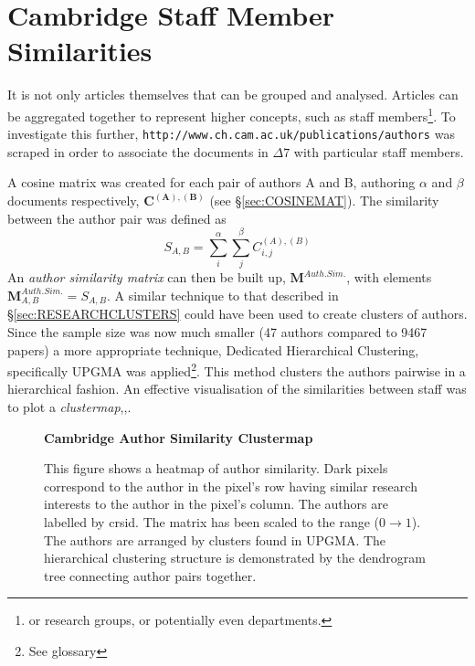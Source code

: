 \section{Cambridge Staff Member Similarities}
\label{sec:AUTHORCLUSTERS}

It is not only articles themselves that can be grouped and analysed. Articles can be aggregated together to represent higher concepts, such as staff members\footnote{or research groups, or potentially even departments. }. To investigate this further, \texttt{http://www.ch.cam.ac.uk/publications/authors} was scraped in order to associate the documents in $\Delta7$ with particular staff members.

A cosine matrix was created for each pair of authors A and B, authoring $\alpha$ and $\beta$ documents respectively, $\mathbf{C^{\left( A \right ) , \left( B \right)}}$ (see \S\ref{sec:COSINEMAT}). The similarity between the author pair was defined as 
$$S_{A , B} = \sum_{i}^{\alpha} \sum_{j}^{\beta} C^{\left( A \right) , \left( B \right) }_{ i , j }$$
An \emph{author similarity matrix} can then be built up, $\mathbf{M}^{Auth. Sim.}$, with elements $\mathbf{M}^{Auth. Sim.}_{ A , B }=S_{ A , B }$.
A similar technique to that described in  \S\ref{sec:RESEARCHCLUSTERS} could have been used to create clusters of authors. Since the sample size was now much smaller (47 authors compared to 9467 papers) a more appropriate technique, Dedicated Hierarchical Clustering, specifically UPGMA was applied\cite{heatmapcluster}\footnote{See glossary}. This method clusters the authors pairwise in a hierarchical fashion.  An effective visualisation of the similarities between staff was to plot a \emph{clustermap},\cite{seaborn},\cite{scipy}.
\begin{center}
\begin{figure}[H]
  \centering
  \textbf{Cambridge Author Similarity Clustermap}
    \caption[Cambrdige Author Similarity Clustermap]{This figure shows a heatmap of author similarity. Dark pixels correspond to the author in the pixel's row having similar research interests to the author in the pixel's column. The authors are labelled by crsid. The matrix has been scaled to the range ($0 \rightarrow 1$).  The authors are arranged by clusters found in UPGMA. The hierarchical clustering structure is demonstrated by the dendrogram tree connecting author pairs together.}
    \label{fig:AUTHORSIMS}

\end{figure} 
\end{center}
